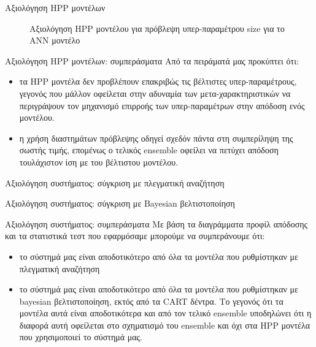 \documentclass{beamer}
\begin{document}
  \begin{frame}{Αξιολόγηση HPP μοντέλων} 
  	\begin{figure}[!htb]
  Αξιολόγηση HPP μοντέλου για πρόβλεψη υπερ-παραμέτρου size για το ΑΝΝ μοντέλο
  		\scalebox{0.6}{
  			}
  	\end{figure}
  \end{frame}
  \begin{frame}{Αξιολόγηση HPP μοντέλων: συμπεράσματα}
  	Από τα πειράματά μας προκύπτει ότι:
  	\begin{itemize}
  		\item τα HPP μοντέλα δεν προβλέπουν επακριβώς τις βέλτιστες υπερ-παραμέτρους, γεγονός που μάλλον οφείλεται στην αδυναμία των μετα-χαρακτηριστικών να περιγράψουν τον μηχανισμό επιρροής των υπερ-παραμέτρων στην απόδοση ενός μοντέλου.
  		\item η χρήση διαστημάτων πρόβλεψης οδηγεί σχεδόν πάντα στη συμπερίληψη της σωστής τιμής, επομένως ο τελικός ensemble οφείλει να πετύχει απόδοση τουλάχιστον ίση με του βέλτιστου μοντέλου. 
  	\end{itemize}
  \end{frame}
  \begin{frame}{Αξιολόγηση συστήματος: σύγκριση με πλεγματική αναζήτηση} 
  	\begin{figure}[!htb]
  		\scalebox{0.5}{
  			}
  	\end{figure}
  \end{frame}
    \begin{frame}{Αξιολόγηση συστήματος: σύγκριση με Bayesian βελτιστοποίηση} 
    	\begin{figure}[!htb]
    		\scalebox{0.5}{
    			}
    	\end{figure}
    \end{frame}
    \begin{frame}{Αξιολόγηση συστήματος: συμπεράσματα}
    	Με βάση τα διαγράμματα προφίλ απόδοσης και τα στατιστικά τεστ που εφαρμόσαμε μπορούμε να συμπεράνουμε ότι:
    	\begin{itemize}
    		\item το σύστημά μας είναι αποδοτικότερο από όλα τα μοντέλα που ρυθμίστηκαν με πλεγματική αναζήτηση
    		\item το σύστημά μας είναι αποδοτικότερο από όλα τα μοντέλα που ρυθμίστηκαν με bayesian βελτιστοποίηση, εκτός από τα CART δέντρα. Το γεγονός ότι τα μοντέλα αυτά είναι αποδοτικότερα και από τον τελικό ensemble υποδηλώνει ότι η διαφορά αυτή οφείλεται στο σχηματισμό του ensemble και όχι στα HPP μοντέλα που χρησιμοποιεί το σύστημά μας.
    	\end{itemize}
    \end{frame}
\end{document}

